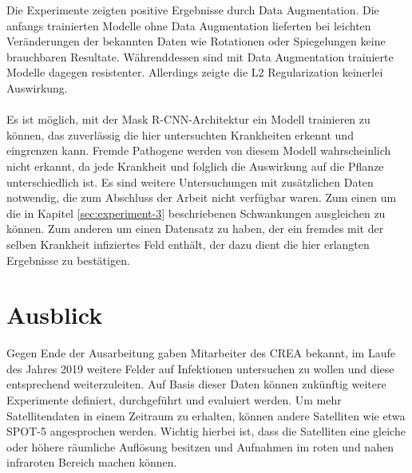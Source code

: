 Die Experimente zeigten positive Ergebnisse durch Data Augmentation. Die anfangs trainierten Modelle ohne Data Augmentation lieferten bei leichten Veränderungen der bekannten Daten wie Rotationen oder Spiegelungen keine brauchbaren Resultate. Währenddessen sind mit Data Augmentation trainierte Modelle dagegen resistenter. Allerdings zeigte die L2 Regularization keinerlei Auswirkung.
\\\\
Es ist möglich, mit der Mask R-CNN-Architektur ein Modell trainieren zu können, das zuverlässig die hier untersuchten Krankheiten erkennt und eingrenzen kann. Fremde Pathogene werden von diesem Modell wahrscheinlich nicht erkannt, da jede Krankheit und folglich die Auswirkung auf die Pflanze unterschiedlich ist. Es sind weitere Untersuchungen mit zusätzlichen Daten notwendig, die zum Abschluss der Arbeit nicht verfügbar waren. Zum einen um die in Kapitel \ref{sec:experiment-3} beschriebenen Schwankungen ausgleichen zu können. Zum anderen um einen Datensatz zu haben, der ein fremdes mit der selben Krankheit infiziertes Feld enthält, der dazu dient die hier erlangten Ergebnisse zu bestätigen. 

\chapter{Ausblick}

Gegen Ende der Ausarbeitung gaben Mitarbeiter des CREA bekannt, im Laufe des Jahres 2019 weitere Felder auf Infektionen untersuchen zu wollen und diese entsprechend weiterzuleiten. Auf Basis dieser Daten können zukünftig weitere Experimente definiert, durchgeführt und evaluiert werden. Um mehr Satellitendaten in einem Zeitraum zu erhalten, können andere Satelliten wie etwa SPOT-5 angesprochen werden. Wichtig hierbei ist, dass die Satelliten eine gleiche oder höhere räumliche Auflösung besitzen und Aufnahmen im roten und nahen infraroten Bereich machen können. 
